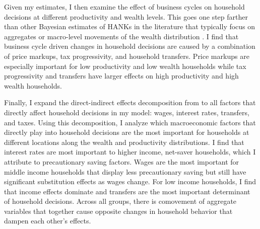 Given my estimates, I then examine the effect of business cycles on household decisions at different productivity and wealth levels. This goes one step farther than other Bayesian estimates of HANKs in the literature that typically focus on aggregates \autocites{auclert2020micro}{acharya2023estimating} or macro-level movements of the wealth distribution \autocites{bayer2024shocks}. I find that business cycle driven changes in household decisions are caused by a combination of price markups, tax progressivity, and household transfers. Price markups are especially important for low productivity and low wealth households while tax progressivity and transfers have larger effects on high productivity and high wealth households.

Finally, I expand the direct-indirect effects decomposition from \textcite{kaplan2018monetary} to all factors that directly affect household decisions in my model: wages, interest rates, transfers, and taxes. Using this decomposition, I analyze which macroeconomic factors that directly play into household decisions are the most important for households at different locations along the wealth and productivity distributions. I find that interest rates are most important to higher income, net-saver households, which I attribute to precautionary saving factors. Wages are the most important for middle income households that display less precautionary saving but still have significant substitution effects as wages change. For low income households, I find that income effects dominate and transfers are the most important determinant of household decisions. Across all groups, there is comovement of aggregate variables that together cause opposite changes in household behavior that dampen each other's effects. 
